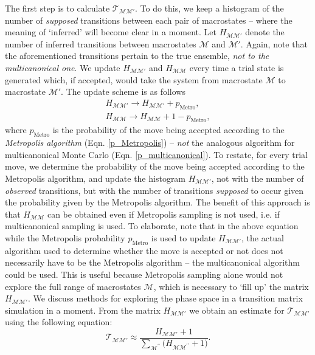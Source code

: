 \documentclass{report}
\begin{document}
The first step is to calculate $\mathcal{T}_{\mathcal{MM}'}$. To do this, we keep a histogram of the number of \emph{supposed} transitions between 
each pair of macrostates -- where the meaning of `inferred' will become clear in a moment. Let $H_{\mathcal{M}\mathcal{M}'}$ denote the number of inferred 
transitions between macrostates $\mathcal{M}$ and $\mathcal{M}'$. Again, note that the aforementioned transitions pertain to the true ensemble, 
\emph{not to the multicanonical one}. We update $H_{\mathcal{M}\mathcal{M}'}$ and $H_{\mathcal{M}\mathcal{M}}$ every time a trial state is generated which, if 
accepted, would take the system from macrostate $\mathcal{M}$ to macrostate $\mathcal{M}'$. The update scheme is as follows
\begin{equation}
\begin{split}
H_{\mathcal{M}\mathcal{M}'}\to H_{\mathcal{M}\mathcal{M}'}+p_{\text{Metro}}, \\
H_{\mathcal{M}\mathcal{M}}\to H_{\mathcal{M}\mathcal{M}}+1-p_{\text{Metro}},
\end{split}
\end{equation}
where $p_{\text{Metro}}$ is the probability of the move being accepted according to the \emph{Metropolis algorithm} (Eqn. \eqref{p_Metropolis}) --
\emph{not} the analogous algorithm for multicanonical Monte Carlo (Eqn. \eqref{p_multicanonical}). To restate, for every trial move, we determine the
probability of the move being accepted according to the Metropolis algorithm, and update the histogram $H_{\mathcal{M}\mathcal{M}'}$, not with
the number of \emph{observed} transitions, but with the number of transitions \emph{supposed} to occur given the probability given by the
Metropolis algorithm. 
The benefit of this approach is that $H_{\mathcal{M}\mathcal{M}}$ can be obtained even if Metropolis sampling is not used, i.e.
if multicanonical sampling is used. To elaborate, note that in the above equation while the Metropolis probability $p_{\text{Metro}}$ is used to update 
$H_{\mathcal{M}\mathcal{M}'}$, the actual algorithm used to determine whether the move is accepted or not does not necessarily have to be the Metropolis
algorithm -- the multicanonical algorithm could be used. This is useful because Metropolis sampling alone would not explore the full range of
macrostates $\mathcal{M}$, which is necessary to `fill up' the matrix $H_{\mathcal{M}\mathcal{M}'}$. We discuss methods for exploring the phase space
in a transition matrix simulation in a moment.
From the matrix $H_{\mathcal{M}\mathcal{M}'}$ we obtain an estimate for $\mathcal{T}_{\mathcal{MM}'}$ using the following equation:
\begin{equation}\label{T_estimate}
\mathcal{T}_{\mathcal{M}\mathcal{M}'}\approx \frac{H_{\mathcal{M}\mathcal{M}'}+1}
{\displaystyle\sum_{\mathcal{M}^{\prime\prime}}\bigl(H_{\mathcal{M}\mathcal{M}^{\prime\prime}}+1\bigr)}.
\end{equation}
\end{document}
